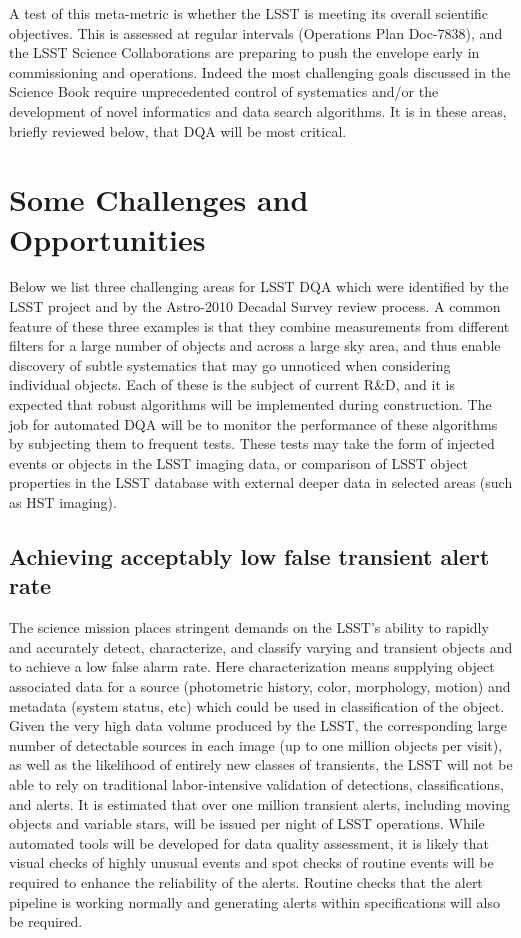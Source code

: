\documentclass[SE,toc]{lsstdoc}
\begin{document}
A test of this meta-metric is whether the LSST is meeting its overall scientific objectives.  This is assessed at regular intervals (Operations Plan Doc-7838), and the LSST Science Collaborations are preparing to push the envelope early in commissioning and operations. Indeed the most challenging goals discussed in the Science Book require unprecedented control of systematics and/or the development of novel informatics and data search algorithms. It is in these areas, briefly reviewed below,  that DQA will be most critical.



\section{Some Challenges and Opportunities}

Below we list three challenging areas for LSST DQA which were identified by the LSST project and by the Astro-2010 Decadal Survey review process. A common feature of these three examples is that they combine measurements from different filters for a large number of objects and across a large sky area, and thus enable discovery of subtle systematics that may go unnoticed when considering individual objects. Each of these is the subject of current R\&D, and it is expected that robust algorithms will be implemented during construction.  The job for automated DQA will be to monitor the performance of these algorithms by subjecting them to frequent tests. These tests may take the form of injected events or objects in the LSST imaging data, or comparison of LSST object properties in the LSST database with external deeper data in selected areas (such as HST imaging).

\subsection{Achieving acceptably low false transient alert rate}

The science mission places stringent demands on the LSST's ability to rapidly and accurately detect, characterize, and classify varying and transient objects and to achieve a low false alarm rate.  Here characterization means supplying object associated data for a source (photometric history, color, morphology, motion) and metadata (system status, etc) which could be used in classification of the object.  Given the very high data volume  produced by the LSST, the corresponding large number of detectable sources in each  image (up to one million objects per visit), as well as the  likelihood of entirely new classes of transients, the LSST will not be able  to rely on traditional labor-intensive validation of detections,  classifications, and alerts.  It is estimated that over one million transient alerts, including moving objects and variable stars, will be issued per night of LSST operations. While automated tools will be developed for data quality assessment, it is likely that visual checks of highly unusual events and spot checks of routine events will be required to enhance the reliability of the alerts.  Routine checks that the alert pipeline is working normally and generating alerts within specifications will also be required.
\end{document}
